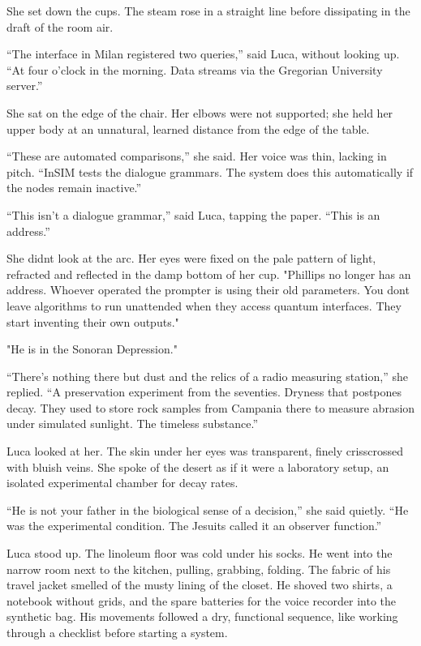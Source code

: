 \documentclass[
  ngerman,
]{article}
\begin{document}
She set down the cups. The steam rose in a straight line before
dissipating in the draft of the room air.

``The interface in Milan registered two queries,'' said Luca, without
looking up. ``At four o'clock in the morning. Data streams via the
Gregorian University server.''

She sat on the edge of the chair. Her elbows were not supported; she
held her upper body at an unnatural, learned distance from the edge of
the table.

``These are automated comparisons,'' she said. Her voice was thin,
lacking in pitch. ``InSIM tests the dialogue grammars. The system does
this automatically if the nodes remain inactive.''

``This isn't a dialogue grammar,'' said Luca, tapping the paper. ``This
is an address.''

She didn\textquotesingle t look at the arc. Her eyes were fixed on the
pale pattern of light, refracted and reflected in the damp bottom of her
cup. "Phillips no longer has an address. Whoever operated the prompter
is using their old parameters. You don\textquotesingle t leave
algorithms to run unattended when they access quantum interfaces. They
start inventing their own outputs."

"He is in the Sonoran Depression."

``There's nothing there but dust and the relics of a radio measuring
station,'' she replied. ``A preservation experiment from the seventies.
Dryness that postpones decay. They used to store rock samples from
Campania there to measure abrasion under simulated sunlight. The
timeless substance.''

Luca looked at her. The skin under her eyes was transparent, finely
crisscrossed with bluish veins. She spoke of the desert as if it were a
laboratory setup, an isolated experimental chamber for decay rates.

``He is not your father in the biological sense of a decision,'' she
said quietly. ``He was the experimental condition. The Jesuits called it
an observer function.''

Luca stood up. The linoleum floor was cold under his socks. He went into
the narrow room next to the kitchen, pulling, grabbing, folding. The
fabric of his travel jacket smelled of the musty lining of the closet.
He shoved two shirts, a notebook without grids, and the spare batteries
for the voice recorder into the synthetic bag. His movements followed a
dry, functional sequence, like working through a checklist before
starting a system.
\end{document}
